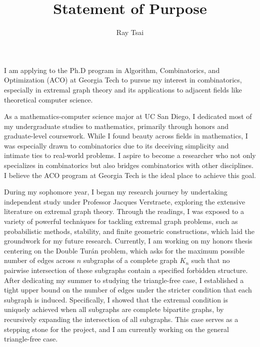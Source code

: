 \documentclass[12pt]{article}
\title{Statement of Purpose}
\author{Ray Tsai}
\date{}
\begin{document}
\maketitle

\vspace{-0.25in}

I am applying to the Ph.D program in Algorithm, Combinatorics, and Optimization (ACO) at Georgia
Tech to pursue my interest in combinatorics, especially in extremal graph theory and its
applications to adjacent fields like theoretical computer science.

As a mathematics-computer science major at UC San Diego, I dedicated most of my undergraduate
studies to mathematics, primarily through honors and graduate-level coursework. While I found beauty
across fields in mathematics, I was especially drawn to combinatorics due to its deceiving
simplicity and intimate ties to real-world problems. I aspire to become a researcher who not only
specializes in combinatorics but also bridges combinatorics with other disciplines. I believe the
ACO program at Georgia Tech is the ideal place to achieve this goal.

During my sophomore year, I began my research journey by undertaking independent study under
Professor Jacques Verstraete, exploring the extensive literature on extremal graph theory. Through
the readings, I was exposed to a variety of powerful techniques for tackling extremal graph
problems, such as probabilistic methods, stability, and finite geometric constructions, which laid
the groundwork for my future research. Currently, I am working on my honors thesis centering on the
Double Turán problem, which asks for the maximum possible number of edges across $n$ subgraphs of a
complete graph $K_n$ such that no pairwise intersection of these subgraphs contain a specified
forbidden structure. After dedicating my summer to studying the triangle-free case, I established a
tight upper bound on the number of edges under the stricter condition that each subgraph is induced.
Specifically, I showed that the extremal condition is uniquely achieved when all subgraphs are
complete bipartite graphs, by recursively expanding the intersection of all subgraphs. This case
serves as a stepping stone for the project, and I am currently working on the general triangle-free
case. 
\end{document}
